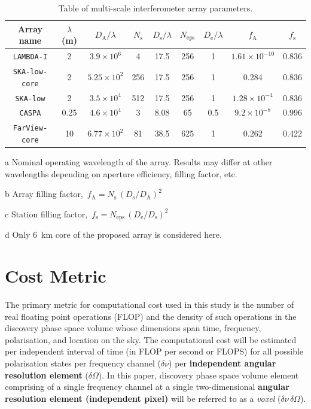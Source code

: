 \documentclass[
  journal=pasa,
  manuscript=article-type,
  year=2020,
  volume=37,
]{cup-journal}
\begin{document}
\begin{table}[htb!]
\normalsize
\begin{threeparttable}
\caption{Table of multi-scale interferometer array parameters.}
\label{tab:array_params}
\begin{tabular}{ccccccc|cc}
\toprule
\headrow Array name & $\lambda$ (m)\tnote{a} & $D_\textrm{A}/\lambda$ & $N_\textrm{s}$ & $D_\textrm{s}/\lambda$ & $N_\textrm{eps}$ & $D_\textrm{e}/\lambda$ & $f_\textrm{A}$\tnote{b} & $f_\textrm{s}$\tnote{c} \\
\midrule
\texttt{LAMBDA-I} & 2 & $3.9\times 10^6$ & 4 & 17.5 & 256 & 1 &  $1.61\times 10^{-10}$ & 0.836 \\ 
\texttt{SKA-low-core} & 2 & $5.25\times 10^{2}$ & 256 & 17.5 & 256 & 1 & 0.284 & 0.836 \\ 
\texttt{SKA-low} & 2 & $3.5\times 10^4$ & 512 & 17.5 & 256 & 1 &  $1.28\times 10^{-4}$ & 0.836 \\ 
\texttt{CASPA} & 0.25 & $4.6\times 10^4$ & 3 & 8.08 & 65 & 0.5 &  $9.2\times 10^{-8}$ & 0.996 \\ 
\texttt{FarView-core}\tnote{d} & 10 & $6.77\times 10^2$ & 81 & 38.5 & 625 & 1 & 0.262 & 0.422 \\ 
\bottomrule
\end{tabular}
\begin{tablenotes}[hang]
\item[a]Nominal operating wavelength of the array. Results may differ at other wavelengths depending on aperture efficiency, filling factor, etc. 
\item[b]Array filling factor, $\,f_\textrm{A}=N_\textrm{s}\,(D_\textrm{s}/D_\textrm{A})^2$
\item[c]Station filling factor, $\,f_\textrm{s}=N_\textrm{eps}\,(D_\textrm{e}/D_\textrm{s})^2$
\item[d]Only 6~km core of the proposed array \citep{Polidan+2024} is considered here.
\end{tablenotes}
\end{threeparttable}
\end{table}

\section{Cost Metric} \label{sec:computational-cost}

The primary metric for computational cost used in this study is the number of real floating point operations (FLOP) and the density of such operations in the discovery phase space volume whose dimensions span time, frequency, polarisation, and location on the sky. The computational cost will be estimated per independent interval of time (in FLOP per second or FLOPS) for all possible polarisation states per frequency channel ($\delta\nu$) per \textbf{independent angular resolution element} ($\delta\Omega$). In this paper, discovery phase space volume element comprising of a single frequency channel at a single two-dimensional \textbf{angular resolution element (independent pixel)} will be referred to as a \textit{voxel} ($\delta\nu\,\delta\Omega$).
\end{document}
